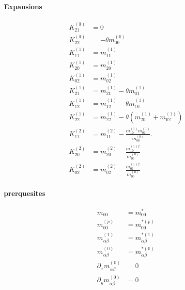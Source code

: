 \documentclass{article}
\begin{document}
  \paragraph{Expansions}
  \begin{align}
      K_{21}^{(0)} & = 0 \tag{E1}\\
      K_{22}^{(0)} & = -\theta m_{00}^{(0)}\tag{E2}\\
      K_{11}^{(1)} & = m_{11}^{(1)} \tag{E3}\\
      K_{20}^{(1)} & = m_{20}^{(1)} \tag{E4}\\
      K_{02}^{(1)} & = m_{02}^{(1)} \tag{E5}\\
      K_{21}^{(1)} & = m_{21}^{(1)} - \theta m_{01}^{(1)} \tag{E6}\\
      K_{12}^{(1)} & = m_{12}^{(1)} - \theta m_{10}^{(1)} \tag{E7}\\
      K_{22}^{(1)} & = m_{22}^{(1)} - \theta (m_{20}^{(1)} + m_{02}^{(1)}) \tag{E8}\\
      K_{11}^{(2)} & = m_{11}^{(2)} - \frac{ m_{10}^{(1)}m_{01}^{(1)}}{m_{00}^{(0)}}. \tag{E9}\\
      K_{20}^{(2)} & = m_{20}^{(2)} - \frac{ m_{10}^{(1)2}}{m_{00}^{(0)}} \tag{E10}\\
      K_{02}^{(2)} & = m_{02}^{(2)} - \frac{ m_{01}^{(1)2}}{m_{00}^{(0)}} \tag{E11}
  \end{align}

  \paragraph{prerquesites}
  \begin{align}
    m_{00} &= m_{00}^*  \tag{P1}\\
    m_{00}^{(p)} &= m_{00}^{*(p)} \tag{P2} \\
    m_{\alpha\beta}^{(1)} &= m_{\alpha\beta}^{*(1)} \tag{P3} \\
    m_{\alpha\beta}^{(0)} &= m_{\alpha\beta}^{*(0)} \tag{P4} \\
    \partial_x m_{\alpha\beta}^{(0)} &= 0  \tag{P5}\\
    \partial_y m_{\alpha\beta}^{(0)} &= 0  \tag{P6}
  \end{align}
\end{document}
